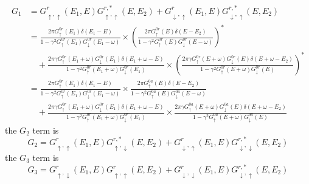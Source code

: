 \documentclass[11pt,a4paper]{article}
\begin{document}
\begin{equation}
\begin{split}
G_{1} &= G_{\uparrow, \uparrow}^{r}(E_{1}, E)G_{\uparrow, \uparrow}^{r,*}(E, E_{2})+G_{\downarrow, \uparrow}^{r}(E_{1},E)G_{\downarrow, \uparrow}^{r,*}(E,E_{2}) \\
&=\frac{2 \pi G_{ \uparrow}^{0r}\left(E_{1}\right) \delta\left(E_{1}-E\right)}{1-\gamma^{2} G_{ \uparrow}^{0r}\left(E_{1}\right) G_{ \downarrow}^{0r}\left(E_{1}-\omega\right)} \times (
\frac{2 \pi G_{ \uparrow}^{0r}\left(E\right) \delta\left(E-E_{2}\right)} {1-\gamma^{2} G_{ \uparrow}^{0r}\left(E\right) G_{ \downarrow}^{0r}\left(E-\omega\right)})^{*} \\
&\quad+ \frac{2 \pi\gamma G_{ \uparrow}^{0r}\left(E_{1}+\omega\right) G_{ \downarrow}^{0r} \left(E_{1}\right) \delta(E_{1}+\omega-E) }{1-\gamma^{2} G_{ \uparrow}^{0r}\left(E_{1}+\omega\right) G_{ \downarrow}^{0r}\left(E_{1}\right)} \times
(\frac{2 \pi\gamma G_{ \uparrow}^{0r}\left(E+\omega\right) G_{ \downarrow}^{0r} \left(E\right) \delta(E+\omega-E_{2}) }{1-\gamma^{2} G_{ \uparrow}^{0r}\left(E+\omega\right) G_{ \downarrow}^{0r}\left(E\right)})^{*} \\
&=\frac{2 \pi G_{ \uparrow}^{0r}\left(E_{1}\right) \delta\left(E_{1}-E\right)}{1-\gamma^{2} G_{ \uparrow}^{0r}\left(E_{1}\right) G_{ \downarrow}^{0r}\left(E_{1}-\omega\right)} \times 
\frac{2 \pi G_{ \uparrow}^{0a}\left(E\right) \delta\left(E-E_{2}\right)} {1-\gamma^{2} G_{ \uparrow}^{0a}\left(E\right) G_{ \downarrow}^{0a}\left(E-\omega\right)} \\
&\quad+ \frac{2 \pi\gamma G_{ \uparrow}^{0r}\left(E_{1}+\omega\right) G_{ \downarrow}^{0r} \left(E_{1}\right) \delta(E_{1}+\omega-E) }{1-\gamma^{2} G_{ \uparrow}^{0r}\left(E_{1}+\omega\right) G_{ \downarrow}^{0r}\left(E_{1}\right)} \times
\frac{2 \pi\gamma G_{ \uparrow}^{0a}\left(E+\omega\right) G_{ \downarrow}^{0a} \left(E\right) \delta(E+\omega-E_{2}) }{1-\gamma^{2} G_{ \uparrow}^{0a}\left(E+\omega\right) G_{ \downarrow}^{0a}\left(E\right)}
\end{split}
\end{equation}
the $G_{2}$ term is
\begin{equation}
G_{2} = G_{\uparrow, \uparrow}^{r}(E_{1}, E)G_{\uparrow, \downarrow}^{r,*}(E,E_{2}) + G_{\downarrow, \uparrow}^{r}(E_{1}, E)G_{\downarrow, \downarrow}^{r,*}(E,E_{2})
\end{equation}
the $G_{3}$ term is
\begin{equation}
G_{3} = G_{\uparrow, \downarrow}^{r}(E_{1},E)G_{\uparrow, \uparrow}^{r}(E, E_{2}) + G_{\downarrow, \downarrow}^{r}(E_{1},E)G_{\downarrow, \uparrow}^{r,*}(E,E_{2})
\end{equation}
\end{document}
